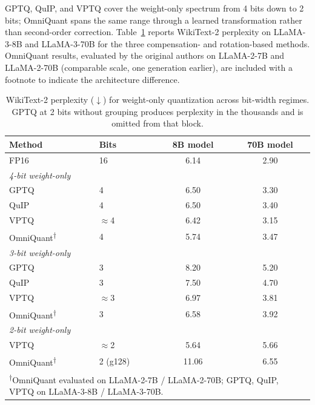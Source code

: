 GPTQ, QuIP, and VPTQ cover the weight-only spectrum from 4 bits down to 2 bits; OmniQuant spans the same range through a learned transformation rather than second-order correction. Table~\ref{tab:weight-only-spectrum} reports WikiText-2 perplexity on LLaMA-3-8B and LLaMA-3-70B for the three compensation- and rotation-based methods. OmniQuant results, evaluated by the original authors on LLaMA-2-7B and LLaMA-2-70B (comparable scale, one generation earlier), are included with a footnote to indicate the architecture difference.

\begin{table}[htbp]
\centering
\caption[Weight-only quantization spectrum]{WikiText-2 perplexity ($\downarrow$) for weight-only quantization across bit-width regimes. GPTQ at 2 bits without grouping produces perplexity in the thousands and is omitted from that block.}
\label{tab:weight-only-spectrum}
\begin{tabular}{llcc}
  \toprule
  \textbf{Method} & \textbf{Bits} & \textbf{8B model} & \textbf{70B model} \\
  \midrule
  FP16 & 16 & 6.14 & 2.90 \\
  \midrule
  \multicolumn{4}{l}{\textit{4-bit weight-only}} \\
  GPTQ                & 4            & 6.50 & 3.30 \\
  QuIP                & 4            & 6.50 & 3.40 \\
  VPTQ                & $\approx$4   & 6.42 & 3.15 \\
  OmniQuant\textsuperscript{$\dagger$} & 4 & 5.74 & 3.47 \\
  \midrule
  \multicolumn{4}{l}{\textit{3-bit weight-only}} \\
  GPTQ                & 3            & 8.20 & 5.20 \\
  QuIP                & 3            & 7.50 & 4.70 \\
  VPTQ                & $\approx$3   & 6.97 & 3.81 \\
  OmniQuant\textsuperscript{$\dagger$} & 3 & 6.58 & 3.92 \\
  \midrule
  \multicolumn{4}{l}{\textit{2-bit weight-only}} \\
  VPTQ                & $\approx$2   & 5.64 & 5.66 \\
  OmniQuant\textsuperscript{$\dagger$} & 2 (g128) & 11.06 & 6.55 \\
  \bottomrule
  \multicolumn{4}{l}{\footnotesize\textsuperscript{$\dagger$}OmniQuant evaluated on LLaMA-2-7B / LLaMA-2-70B; GPTQ, QuIP, VPTQ on LLaMA-3-8B / LLaMA-3-70B.}
\end{tabular}
\end{table}

